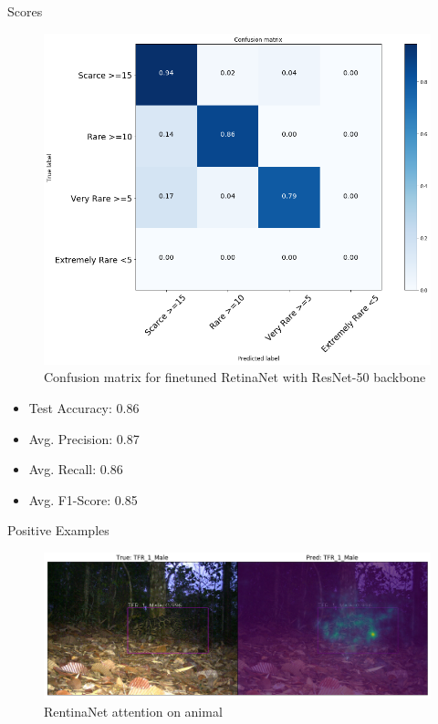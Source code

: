 \documentclass[10pt]{beamer}
\begin{document}
\begin{frame}{Scores}
	\centering
	\begin{minipage}[c]{0.58\linewidth}
		\begin{figure}
			\includegraphics[width=\columnwidth]{images/conf_mat_leo_retina.png}
			\caption{Confusion matrix for finetuned RetinaNet with ResNet-50 backbone}
		\end{figure}
	\end{minipage}
	\begin{minipage}[c]{0.38\linewidth}
		\begin{itemize}
			\item Test Accuracy: 0.86
			\item Avg. Precision:  0.87
			\item Avg. Recall: 0.86
			\item Avg. F1-Score: 0.85
		\end{itemize}
	\end{minipage}
\end{frame}

\begin{frame}{Positive Examples}
	\centering
	\begin{figure}
		\includegraphics[width=\columnwidth]{images/RetinaNet_Attention_correct_good_quality2.png}
		\caption{RentinaNet attention on animal}
	\end{figure}
\end{frame}
\end{document}
